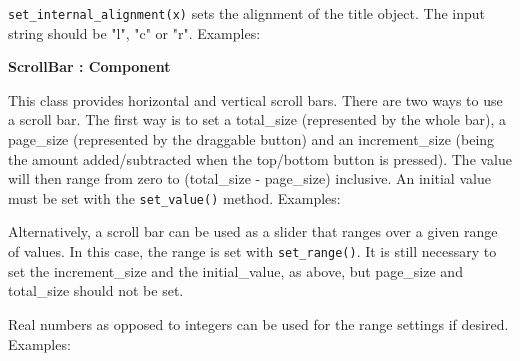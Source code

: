\texttt{set\_internal\_alignment(x)} sets the alignment of the title object. The
input string should be "l",
"c" or "r".
Examples:


{\ttfamily\bfseries
{}ScrollBar : Component}

This class provides horizontal and vertical scroll bars. There are two
ways to use a scroll bar. The first way is to set a total\_size
(represented by the whole bar), a page\_size (represented by the
draggable button) and an increment\_size (being the amount
added/subtracted when the top/bottom button is pressed). The value
will then range from zero to (total\_size - page\_size) inclusive. An
initial value must be set with the \texttt{set\_value()} method. Examples:


Alternatively, a scroll bar can be used as a slider that ranges over a
given range of values. In this case, the range is set with
\texttt{set\_range()}. It is still necessary to set the increment\_size and the
initial\_value, as above, but page\_size and total\_size should not be
set.

Real numbers as opposed to integers can be used for the range settings
if desired. Examples:


